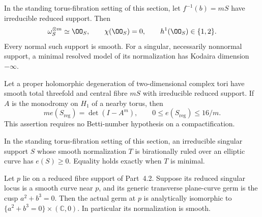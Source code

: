 
\begin{proposition}[P4.12]\hypertarget{tag-02WJ}{}\label{night:P4.12}\label{stmt:P4.12}


In the standing torus-fibration setting of this section, let $f^{-1}(b)=mS$
have irreducible reduced support. Then
\[
 \omega_S^{\otimes m}\simeq\OO_S,\qquad
 \chi(\OO_S)=0,\qquad h^1(\OO_S)\in\{1,2\}.
\]
Every normal such support is smooth. For a singular, necessarily
nonnormal support, a minimal resolved model of its normalization
has Kodaira dimension $-\infty$.
\end{proposition}

\begin{proposition}[P4.13]\hypertarget{tag-02WK}{}\label{night:P4.13}\label{stmt:P4.13}


Let a proper holomorphic degeneration of two-dimensional complex
tori have smooth total threefold and central fibre $mS$ with
irreducible reduced support. If $A$ is the monodromy on $H_1$ of
a nearby torus, then
\[
 m e(S_{\mathrm{reg}})=\det(I-A^m),\qquad
 0\le e(S_{\mathrm{reg}})\le16/m.
\]
This assertion requires no Betti-number hypothesis on a compactification.
\end{proposition}

\begin{proposition}[P4.22]\hypertarget{tag-02WU}{}\label{night:P4.22}\label{stmt:P4.22}


In the standing torus-fibration setting of this section, an irreducible singular support
$S$ whose smooth normalization $T$ is birationally ruled
over an elliptic curve has $e(S)\ge0$. Equality holds
exactly when $T$ is minimal.
\end{proposition}

\begin{proposition}[P4.28]\hypertarget{tag-02X0}{}\label{night:P4.28}\label{stmt:P4.28}


Let $p$ lie on a reduced fibre support of Part~4.2.
Suppose its reduced singular locus is a smooth curve
near $p$, and its generic transverse plane-curve germ
is the cusp $a^2+b^3=0$. Then the actual germ at $p$
is analytically isomorphic to
$\{a^2+b^3=0\}\times(\mathbb C,0)$.
In particular its normalization is smooth.
\end{proposition}

